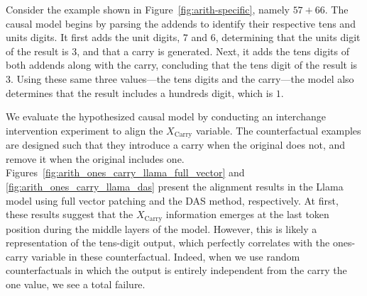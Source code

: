 \documentclass{article}
\theoremstyle{plain}
\theoremstyle{definition}
\theoremstyle{remark}
\newcommand{\carry}{X_{\text{Carry}}}
\begin{document}
Consider the example shown in Figure~\ref{fig:arith-specific}, namely $57+66$. The causal model begins by parsing the addends to identify their respective tens and units digits. It first adds the unit digits, $7$ and $6$, determining that the units digit of the result is $3$, and that a carry is generated. Next, it adds the tens digits of both addends along with the carry, concluding that the tens digit of the result is $3$. Using these same three values—the tens digits and the carry—the model also determines that the result includes a hundreds digit, which is $1$.

We evaluate the hypothesized causal model by conducting an interchange intervention experiment to align the $\carry$ variable. The counterfactual examples are designed such that they introduce a carry when the original does not, and remove it when the original includes one. Figures~\ref{fig:arith_ones_carry_llama_full_vector} and \ref{fig:arith_ones_carry_llama_das} present the alignment results in the Llama model using full vector patching and the DAS method, respectively. At first, these results suggest that the $\carry$ information emerges at the last token position during the middle layers of the model. However, this is likely a representation of the tens-digit output, which perfectly correlates with the ones-carry variable in these counterfactual. Indeed, when we use random counterfactuals in which the output is entirely independent from the carry the one value, we see a total failure.
\end{document}
